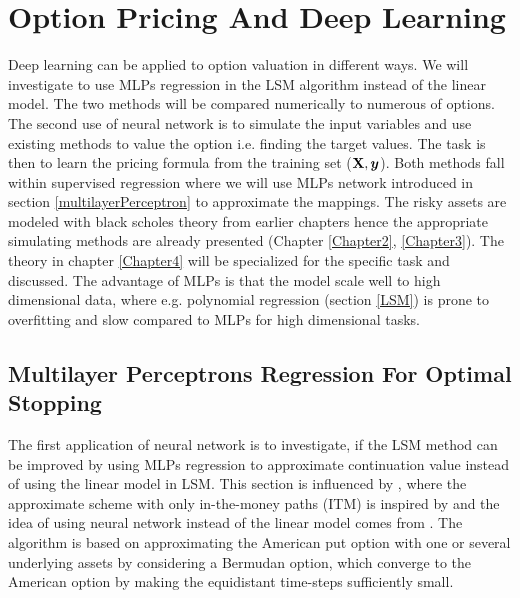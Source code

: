 
\chapter{Option Pricing And Deep Learning} %

\label{Chapter5} %

Deep learning can be applied to option valuation in different ways. We will investigate to use MLPs regression in the LSM algorithm instead of the linear model. The two methods will be compared numerically to numerous of options. The second use of neural network is to simulate the input variables and use existing methods to value the option i.e. finding the target values. The task is then to learn the pricing formula from the training set ($\mathbf{X}, \bm{y}$). Both methods fall within supervised regression where we will use MLPs network introduced in section \ref{multilayerPerceptron} to approximate the mappings. The risky assets are modeled with black scholes theory from earlier chapters hence the appropriate simulating methods are already presented (Chapter \ref{Chapter2}, \ref{Chapter3}). The theory in chapter \ref{Chapter4} will be specialized for the specific task and discussed. The advantage of MLPs is that the model scale well to high dimensional data, where e.g. polynomial regression (section \ref{LSM}) is prone to overfitting and slow compared to MLPs for high dimensional tasks. 

\section{Multilayer Perceptrons Regression For Optimal Stopping}
The first application of neural network is to investigate, if the LSM method can be improved by using MLPs regression to approximate continuation value instead of using the linear model in LSM. This section is influenced by \parencite{LSM, Lelong19, KohlerMichael2010}, where the approximate scheme with only in-the-money paths (ITM) is inspired by \parencite{LSM} and the idea of using neural network instead of the linear model comes from \parencite{KohlerMichael2010, Lelong19}. The algorithm is based on approximating the American put option with one or several underlying assets by considering a Bermudan option, which converge to the American option by making the equidistant time-steps sufficiently small. \\

